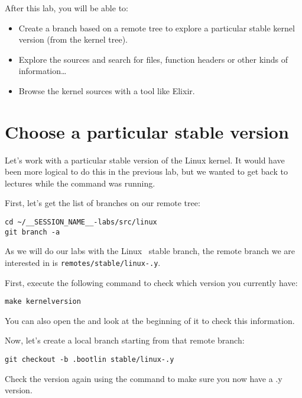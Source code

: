 
After this lab, you will be able to:

\begin{itemize}

\item Create a branch based on a remote tree to explore a particular
      stable kernel version (from the  kernel tree).
\item Explore the sources and search for files, function headers or
  other kinds of information\ldots
\item Browse the kernel sources with a tool like Elixir.
\end{itemize}

\section{Choose a particular stable version}

Let's work with a particular stable version of the Linux kernel.
It would have been more logical to do this in the previous lab, but we
wanted to get back to lectures while the  command was
running.

First, let's get the list of branches on our  remote tree:

\begin{verbatim}
cd ~/__SESSION_NAME__-labs/src/linux
git branch -a
\end{verbatim}

As we will do our labs with the Linux \workingkernel\ stable branch, the remote branch
we are interested in is \texttt{remotes/stable/linux-\workingkernel.y}.

First, execute the following command to check which version you
currently have:

\begin{verbatim}
make kernelversion
\end{verbatim}

You can also open the  and look at the beginning of it
to check this information.

Now, let's create a local branch starting from that remote branch:

\texttt{git checkout -b \workingkernel.bootlin stable/linux-\workingkernel.y}

Check the version again using the  command
to make sure you now have a \workingkernel.y version.

